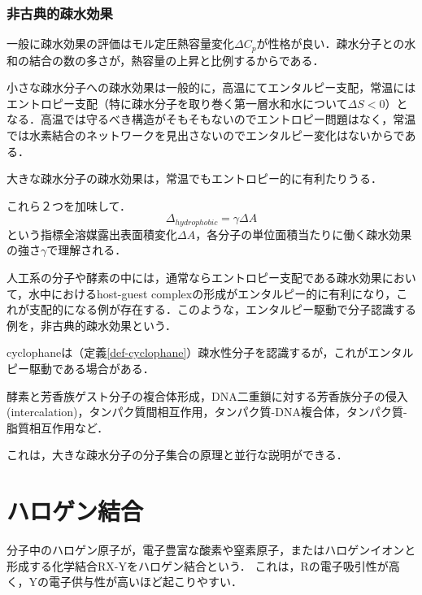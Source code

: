 \documentclass[uplatex, dvipdfmx]{jsreport}
\begin{document}
\subsubsection{非古典的疎水効果}

\begin{screen}
    一般に疎水効果の評価はモル定圧熱容量変化$\Delta C_p$が性格が良い．疎水分子との水和の結合の数の多さが，熱容量の上昇と比例するからである．

    小さな疎水分子への疎水効果は一般的に，高温にてエンタルピー支配，常温にはエントロピー支配（特に疎水分子を取り巻く第一層水和水について$\Delta S<0$）となる．高温では守るべき構造がそもそもないのでエントロピー問題はなく，常温では水素結合のネットワークを見出さないのでエンタルピー変化はないからである．

    大きな疎水分子の疎水効果は，常温でもエントロピー的に有利たりうる．

    これら２つを加味して．\[ \Delta_{hydrophobic} = \gamma\Delta A \]という指標全溶媒露出表面積変化$\Delta A$，各分子の単位面積当たりに働く疎水効果の強さ$\gamma$で理解される．
\end{screen}

\begin{definition}\label{def-nonclassical-hydrophobic-effect}
    人工系の分子や酵素の中には，通常ならエントロピー支配である疎水効果において，水中におけるhost-guest complexの形成がエンタルピー的に有利になり，これが支配的になる例が存在する．このような，エンタルピー駆動で分子認識する例を，非古典的疎水効果という．
\end{definition}
\begin{example}[cyclophane]
    cyclophaneは（定義\ref{def-cyclophane}）疎水性分子を認識するが，これがエンタルピー駆動である場合がある．
\end{example}
\begin{example}
    酵素と芳香族ゲスト分子の複合体形成，DNA二重鎖に対する芳香族分子の侵入(intercalation)，タンパク質間相互作用，タンパク質-DNA複合体，タンパク質-脂質相互作用など．
\end{example}

これは，大きな疎水分子の分子集合の原理と並行な説明ができる．

\section{ハロゲン結合}

\begin{definition}
    分子中のハロゲン原子が，電子豊富な酸素や窒素原子，またはハロゲンイオンと形成する化学結合RX-Yをハロゲン結合という．
    これは，Rの電子吸引性が高く，Yの電子供与性が高いほど起こりやすい．
\end{definition}
\end{document}
